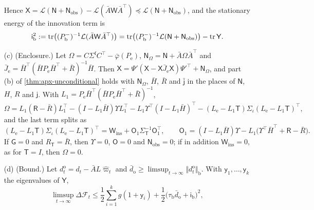 \begin{theorem}
\begin{enumerate}
Hence $\mathsf X=\mathcal L(\mathsf N+\mathsf N_{\mathrm{obs}})-\mathcal L(\bar A\mathsf W\bar A^\top)\preceq\mathcal L(\mathsf N+\mathsf N_{\mathrm{obs}})$, and the stationary energy of the innovation term is
\begin{equation}\label{eq:apx-obs-energy}
\mathsf i_{\mathrm b}^2:=\tr\bigl((P^-_{\mathrm b})^{-1}\mathcal L(\bar A\mathsf W\bar A^\top)\bigr)=\tr\bigl((P^-_{\mathrm b})^{-1}\mathcal L(\mathsf N+\mathsf N_{\mathrm{obs}})\bigr)-\tr\mathsf Y .
\end{equation}
\item[(c)] (Enclosure.) Let $\Omega=C\Sigma^{\mathrm f}C^\top-\bar\varphi(P_{\mathrm e})$, $\mathsf N_\Omega=\mathsf N+\bar A\Omega\bar A^\top$ and $\bar J_{\mathrm e}=\bar H^\top(\bar HP_{\mathrm e}\bar H^\top+\bar R)^{-1}\bar H$. Then $\mathsf X=\Psi'(\mathsf X-\mathsf X\bar J_{\mathrm e}\mathsf X)\Psi'^\top+\mathsf N_\Omega$, and part (b) of \cref{thm:apx-unconditional} holds with $\mathsf N_\Omega$, $\bar H$, $\bar R$ and $\bar{\mathsf j}$ in the places of $\mathsf N$, $H$, $R$ and $\mathsf j$. With $L_1=P_{\mathrm e}\bar H^\top(\bar HP_{\mathrm e}\bar H^\top+\bar R)^{-1}$,
\begin{equation}\label{eq:apx-obs-omega}
\Omega=L_1(\mathsf R-\bar R)L_1^\top-(I-L_1\bar H)\Upsilon L_1^\top-L_1\Upsilon^\top(I-L_1\bar H)^\top-(L_{\mathrm e}-L_1\mathsf T)\Sigma_\iota(L_{\mathrm e}-L_1\mathsf T)^\top ,
\end{equation}
and the last term splits as
\begin{equation}\label{eq:apx-obs-omega-split}
(L_{\mathrm e}-L_1\mathsf T)\Sigma_\iota(L_{\mathrm e}-L_1\mathsf T)^\top=\mathsf W_{\mathrm{ins}}+\mathsf O_1\Sigma_{\mathsf T}^{-1}\mathsf O_1^\top,\qquad\mathsf O_1=(I-L_1\bar H)\Upsilon-L_1\bigl(\Upsilon^\top\bar H^\top+\mathsf R-\bar R\bigr).
\end{equation}
If $\mathsf G=0$ and $R_{\mathsf T}=\bar R$, then $\Upsilon=0$, $\mathsf O=0$ and $\mathsf N_{\mathrm{obs}}=0$; if in addition $\mathsf W_{\mathrm{ins}}=0$, as for $\mathsf T=I$, then $\Omega=0$.
\item[(d)] (Bound.) Let $d^{\mathrm o}_t=d_t-\bar AL\hat\varpi_t$ and $\bar d_{\mathrm o}\ge\limsup_{t\to\infty}\Vert d^{\mathrm o}_t\Vert_{\mathrm b}$. With $\mathsf y_1,\dots,\mathsf y_k$ the eigenvalues of $\mathsf Y$,
\begin{equation}\label{eq:apx-obs-bound}
\limsup_{t\to\infty}\Delta\mathcal F_t\le\frac12\sum_{i=1}^kg(1+\mathsf y_i)+\frac12\bigl(\tau_{\mathrm b}\bar d_{\mathrm o}+\mathsf i_{\mathrm b}\bigr)^2 ,

\end{equation}
\end{enumerate}
\end{theorem}
